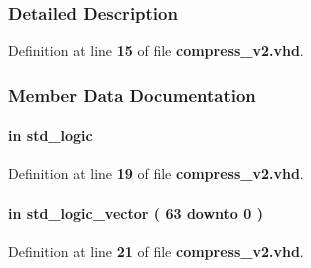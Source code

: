 \subsubsection{Detailed Description}


Definition at line {\bf 15} of file {\bf compress\+\_\+v2.\+vhd}.



\subsubsection{Member Data Documentation}
\paragraph[{clk}]{ {\bfseries \textcolor{keywordflow}{in}\textcolor{vhdlchar}{ }} {\bfseries \textcolor{comment}{std\+\_\+logic}\textcolor{vhdlchar}{ }} \hspace{0.3cm}{\ttfamily [Port]}}\label{classcompress__v2_a4a4609c199d30b3adebbeb3a01276ec5}


Definition at line {\bf 19} of file {\bf compress\+\_\+v2.\+vhd}.

\paragraph[{data\+\_\+in}]{ {\bfseries \textcolor{keywordflow}{in}\textcolor{vhdlchar}{ }} {\bfseries \textcolor{comment}{std\+\_\+logic\+\_\+vector}\textcolor{vhdlchar}{ }\textcolor{vhdlchar}{(}\textcolor{vhdlchar}{ }\textcolor{vhdlchar}{ } \textcolor{vhdldigit}{63} \textcolor{vhdlchar}{ }\textcolor{keywordflow}{downto}\textcolor{vhdlchar}{ }\textcolor{vhdlchar}{ } \textcolor{vhdldigit}{0} \textcolor{vhdlchar}{ }\textcolor{vhdlchar}{)}\textcolor{vhdlchar}{ }} \hspace{0.3cm}{\ttfamily [Port]}}\label{classcompress__v2_a4964e64890b447c67ae1dd95413ec8a5}


Definition at line {\bf 21} of file {\bf compress\+\_\+v2.\+vhd}.

